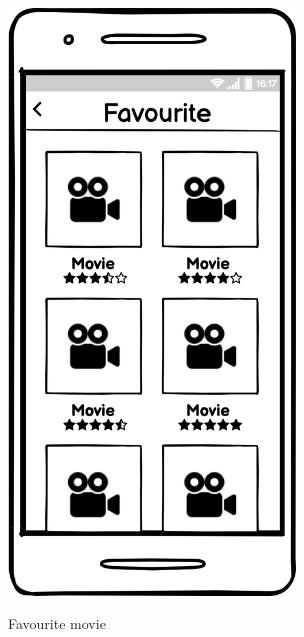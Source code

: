 \documentclass[12pt, a4paper]{article}
\numberwithin{figure}{section}
\begin{document}
\begin{center}
\begin{minipage}{0.31\textwidth}
\begin{figure}[H]
			\includegraphics[width=0.68\textwidth]{images/mockups/Favourite.png}\\
			\caption{Favourite movie}
		\end{figure}
	\end{minipage}
\end{center}
\mbox{}\\
\end{document}
